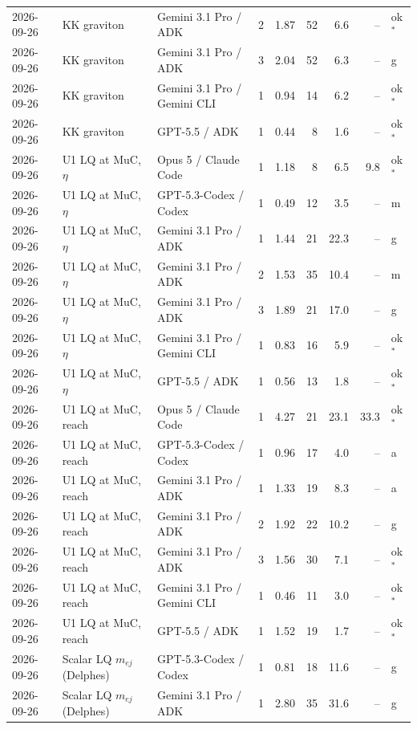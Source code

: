 \begin{longtable}{llllrrrrl}
2026-09-26 & KK graviton & Gemini 3.1 Pro / ADK & 2 & 1.87 & 52 & 6.6 & -- & ok$^{*}$ \\
2026-09-26 & KK graviton & Gemini 3.1 Pro / ADK & 3 & 2.04 & 52 & 6.3 & -- & g \\
2026-09-26 & KK graviton & Gemini 3.1 Pro / Gemini CLI & 1 & 0.94 & 14 & 6.2 & -- & ok$^{*}$ \\
2026-09-26 & KK graviton & GPT-5.5 / ADK & 1 & 0.44 & 8 & 1.6 & -- & ok$^{*}$ \\
2026-09-26 & U1 LQ at MuC, $\eta$ & Opus 5 / Claude Code & 1 & 1.18 & 8 & 6.5 & 9.8 & ok$^{*}$ \\
2026-09-26 & U1 LQ at MuC, $\eta$ & GPT-5.3-Codex / Codex & 1 & 0.49 & 12 & 3.5 & -- & m \\
2026-09-26 & U1 LQ at MuC, $\eta$ & Gemini 3.1 Pro / ADK & 1 & 1.44 & 21 & 22.3 & -- & g \\
2026-09-26 & U1 LQ at MuC, $\eta$ & Gemini 3.1 Pro / ADK & 2 & 1.53 & 35 & 10.4 & -- & m \\
2026-09-26 & U1 LQ at MuC, $\eta$ & Gemini 3.1 Pro / ADK & 3 & 1.89 & 21 & 17.0 & -- & g \\
2026-09-26 & U1 LQ at MuC, $\eta$ & Gemini 3.1 Pro / Gemini CLI & 1 & 0.83 & 16 & 5.9 & -- & ok$^{*}$ \\
2026-09-26 & U1 LQ at MuC, $\eta$ & GPT-5.5 / ADK & 1 & 0.56 & 13 & 1.8 & -- & ok$^{*}$ \\
2026-09-26 & U1 LQ at MuC, reach & Opus 5 / Claude Code & 1 & 4.27 & 21 & 23.1 & 33.3 & ok$^{*}$ \\
2026-09-26 & U1 LQ at MuC, reach & GPT-5.3-Codex / Codex & 1 & 0.96 & 17 & 4.0 & -- & a \\
2026-09-26 & U1 LQ at MuC, reach & Gemini 3.1 Pro / ADK & 1 & 1.33 & 19 & 8.3 & -- & a \\
2026-09-26 & U1 LQ at MuC, reach & Gemini 3.1 Pro / ADK & 2 & 1.92 & 22 & 10.2 & -- & g \\
2026-09-26 & U1 LQ at MuC, reach & Gemini 3.1 Pro / ADK & 3 & 1.56 & 30 & 7.1 & -- & ok$^{*}$ \\
2026-09-26 & U1 LQ at MuC, reach & Gemini 3.1 Pro / Gemini CLI & 1 & 0.46 & 11 & 3.0 & -- & ok$^{*}$ \\
2026-09-26 & U1 LQ at MuC, reach & GPT-5.5 / ADK & 1 & 1.52 & 19 & 1.7 & -- & ok$^{*}$ \\
2026-09-26 & Scalar LQ $m_{ej}$ (Delphes) & GPT-5.3-Codex / Codex & 1 & 0.81 & 18 & 11.6 & -- & g \\
2026-09-26 & Scalar LQ $m_{ej}$ (Delphes) & Gemini 3.1 Pro / ADK & 1 & 2.80 & 35 & 31.6 & -- & g \\

\end{longtable}
